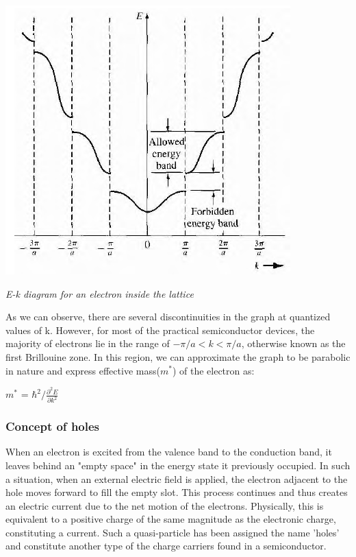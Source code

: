 \documentclass[12 pt]{article}
\begin{document}
  \par
  \begin{center}
   \includegraphics{93mtK.png}
    \end{center}
    \begin{center}
      \emph{E-k diagram for an electron inside the lattice}
  \end{center}
\par

As we can observe, there are several discontinuities in the graph at quantized values of k. However, for most of the practical semiconductor devices, the majority of electrons lie in the range of $-\pi/a < k < \pi/a$, otherwise known as the first Brillouine zone. In this region, we can approximate the graph to be parabolic in nature and express effective mass($m^{*}$) of the electron as:

\begin{center}
    $m^{*}$ = $\hbar^{2}/\frac{\partial^2 E}{\partial k^2}$
\end{center}


\subsubsection{Concept of holes}

When an electron is excited from the valence band to the conduction band, it leaves behind an "empty space" in the energy state it previously occupied. In such a situation, when an external electric field is applied, the electron adjacent to the hole moves forward to fill the empty slot. This process continues and thus creates an electric current due to the net motion of the electrons. Physically, this is equivalent to a positive charge of the same magnitude as the electronic charge, constituting a current. Such a quasi-particle has been assigned the name 'holes' and constitute another type of the charge carriers found in a semiconductor.
\end{document}
